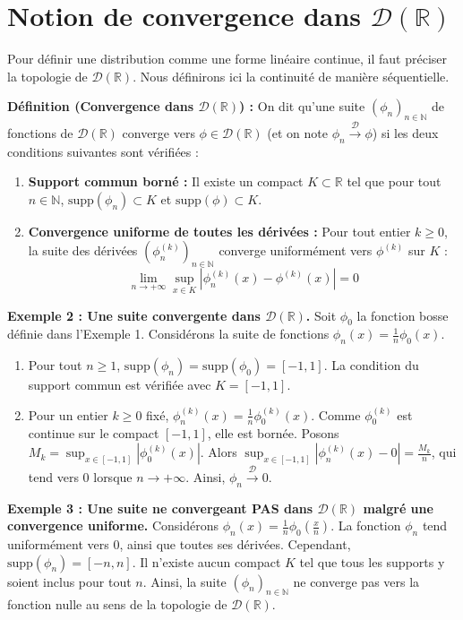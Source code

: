 \documentclass[11pt,a4paper]{article}
\begin{document}
\section{Notion de convergence dans $\mathcal{D}(\mathbb{R})$}

Pour définir une distribution comme une forme linéaire continue, il faut préciser la topologie de $\mathcal{D}(\mathbb{R})$. Nous définirons ici la continuité de manière séquentielle.

\textbf{Définition (Convergence dans $\mathcal{D}(\mathbb{R})$) :} On dit qu'une suite $(\phi_n)_{n \in \mathbb{N}}$ de fonctions de $\mathcal{D}(\mathbb{R})$ converge vers $\phi \in \mathcal{D}(\mathbb{R})$ (et on note $\phi_n \xrightarrow{\mathcal{D}} \phi$) si les deux conditions suivantes sont vérifiées :
\begin{enumerate}
\item \textbf{Support commun borné :} Il existe un compact $K \subset \mathbb{R}$ tel que pour tout $n \in \mathbb{N}$, $\text{supp}(\phi_n) \subset K$ et $\text{supp}(\phi) \subset K$.
\item \textbf{Convergence uniforme de toutes les dérivées :} Pour tout entier $k \ge 0$, la suite des dérivées $(\phi_n^{(k)})_{n \in \mathbb{N}}$ converge uniformément vers $\phi^{(k)}$ sur $K$ :
   $$\lim_{n \to +\infty} \sup_{x \in K} |\phi_n^{(k)}(x) - \phi^{(k)}(x)| = 0$$
\end{enumerate}

\textbf{Exemple 2 : Une suite convergente dans $\mathcal{D}(\mathbb{R})$.}
Soit $\phi_0$ la fonction bosse définie dans l'Exemple 1. Considérons la suite de fonctions $\phi_n(x) = \frac{1}{n} \phi_0(x)$.
\begin{enumerate}
\item Pour tout $n \ge 1$, $\text{supp}(\phi_n) = \text{supp}(\phi_0) = [-1, 1]$. La condition du support commun est vérifiée avec $K = [-1, 1]$.
\item Pour un entier $k \ge 0$ fixé, $\phi_n^{(k)}(x) = \frac{1}{n} \phi_0^{(k)}(x)$. Comme $\phi_0^{(k)}$ est continue sur le compact $[-1, 1]$, elle est bornée. Posons $M_k = \sup_{x \in [-1, 1]} |\phi_0^{(k)}(x)|$.
   Alors $\sup_{x \in [-1, 1]} |\phi_n^{(k)}(x) - 0| = \frac{M_k}{n}$, qui tend vers $0$ lorsque $n \to +\infty$.
Ainsi, $\phi_n \xrightarrow{\mathcal{D}} 0$.
\end{enumerate}

\textbf{Exemple 3 : Une suite ne convergeant PAS dans $\mathcal{D}(\mathbb{R})$ malgré une convergence uniforme.}
Considérons $\phi_n(x) = \frac{1}{n} \phi_0\left(\frac{x}{n}\right)$.
La fonction $\phi_n$ tend uniformément vers $0$, ainsi que toutes ses dérivées.
Cependant, $\text{supp}(\phi_n) = [-n, n]$. Il n'existe aucun compact $K$ tel que tous les supports y soient inclus pour tout $n$.
Ainsi, la suite $(\phi_n)_{n \in \mathbb{N}}$ ne converge pas vers la fonction nulle au sens de la topologie de $\mathcal{D}(\mathbb{R})$.
\end{document}
